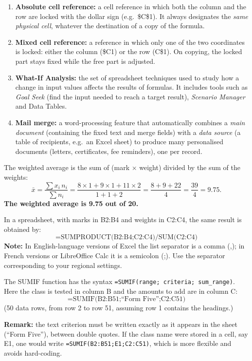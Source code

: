\documentclass[11pt]{article}
\newcommand{\cle}[1]{{\popxbold\color{popdark}#1}}
\newcounter{popsec}
\newcounter{popsub}
\newcommand{\courssub}[1]{%
  \stepcounter{popsub}%
  \par\vspace{9pt}\noindent{\popxbold\fontsize{11.5}{13}\selectfont\color{popink}{\color{poporange}\thepopsec.\thepopsub}\hspace{6pt}#1}\par\nopagebreak\vspace{4pt}
}
\begin{document}
\begin{corrige}
\begin{enumerate}
\item \textbf{Absolute cell reference:} a cell reference in which both the column and the row are locked with the dollar sign (e.g.\ \$C\$1). It always designates the \emph{same physical cell}, whatever the destination of a copy of the formula.
\item \textbf{Mixed cell reference:} a reference in which only one of the two coordinates is locked: either the column (\$C1) or the row (C\$1). On copying, the locked part stays fixed while the free part is adjusted.
\item \textbf{What-If Analysis:} the set of spreadsheet techniques used to study how a change in input values affects the results of formulas. It includes tools such as \emph{Goal Seek} (find the input needed to reach a target result), \emph{Scenario Manager} and \cle{Data Tables}.
\item \textbf{Mail merge:} a word-processing feature that automatically combines a \emph{main document} (containing the fixed text and merge fields) with a \emph{data source} (a table of recipients, e.g.\ an Excel sheet) to produce many personalised documents (letters, certificates, fee reminders), one per record.
\end{enumerate}
\end{corrige}

\begin{corrige}
The weighted average is the sum of (mark $\times$ weight) divided by the sum of the weights:
\[
\bar{x}=\frac{\sum x_i\,n_i}{\sum n_i}=\frac{8\times1+9\times1+11\times2}{1+1+2}=\frac{8+9+22}{4}=\frac{39}{4}=9.75.
\]
\textbf{The weighted average is 9.75 out of 20.}

In a spreadsheet, with marks in B2:B4 and weights in C2:C4, the same result is obtained by:
\[ =\text{SUMPRODUCT(B2:B4;C2:C4)/SUM(C2:C4)} \]
\textbf{Note:} In English-language versions of Excel the list separator is a comma (,); in French versions or LibreOffice Calc it is a semicolon (;). Use the separator corresponding to your regional settings.
\end{corrige}

\courssub{Solutions -- I practise}

\begin{corrige}
The \cle{SUMIF} function has the syntax \texttt{=SUMIF(range; criteria; sum\_range)}. Here the class is tested in column B and the amounts to add are in column C:
\[ =\text{SUMIF(B2:B51;``Form Five'';C2:C51)} \]
(50 data rows, from row 2 to row 51, assuming row 1 contains the headings.)

\textbf{Remark:} the text criterion must be written exactly as it appears in the sheet (``Form Five''), between double quotes. If the class name were stored in a cell, say E1, one would write \texttt{=SUMIF(B2:B51;E1;C2:C51)}, which is more flexible and avoids hard-coding.
\end{corrige}
\end{document}
